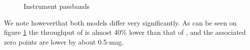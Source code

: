 \documentclass[\docopts]{\docclass}
\begin{document}
\begin{figure}[t]
\begin{center}
\caption{Instrument passbands}
\label{fig:throughput_comparison}
\end{center}
\end{figure}

We note howeverthat both models differ very significantly.  As can be
seen on figure \ref{fig:throughput_comparison} the throughput of
 is almost 40\% lower than that of , and
the associated zero points are lower by about 0.5-mag.  
\end{document}
